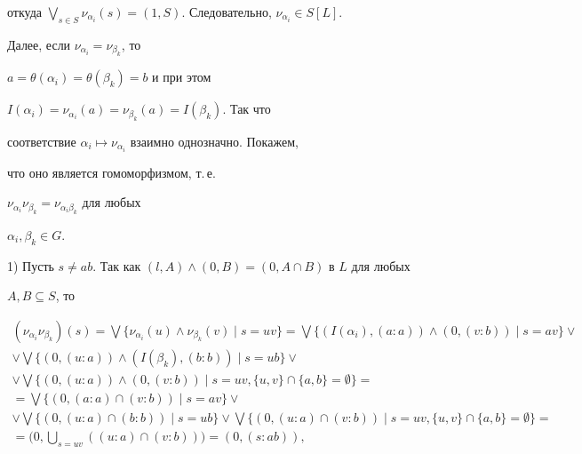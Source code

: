 откуда $\bigvee\limits_{s\in


S}\nu_{\alpha_i}(s)=(1,S)$. Следовательно, $\nu_{\alpha_i}\in S[L]$.





Далее, если $\nu_{\alpha_i}=\nu_{\beta_k}$, то


$a=\theta(\alpha_i)=\theta(\beta_k)=b$ и при этом


$I(\alpha_i)=\nu_{\alpha_i}(a)=\nu_{\beta_k}(a)=I(\beta_k)$. Так что


соответствие $\alpha_i\mapsto \nu_{\alpha_i}$ взаимно однозначно. Покажем,


что оно является гомоморфизмом, т.\,е.


$\nu_{\alpha_i}\nu_{\beta_k}=\nu_{\alpha_i\beta_k}$ для любых


$\alpha_i,\beta_k\in G$.





1) Пусть $s\ne ab$. Так как $(l,A)\wedge(0,B)=(0,A\cap B)$ в $L$ для любых


$A,B\subseteq S$, то


\begin{multline*}


(\nu_{\alpha_i}\nu_{\beta_k})(s)=\bigvee\{\nu_{\alpha_i}(u)\wedge


\nu_{\beta_k}(v)\mid


s=uv\}=\bigvee\{(I(\alpha_i),(a:a))\wedge(0,(v:b))\mid s=av\}\vee \\


%


\vee \bigvee\{(0,(u:a))\wedge (I(\beta_k),(b:b))\mid


s=ub\}\vee \\


%


\vee\bigvee\{(0,(u:a))\wedge (0,(v:b))\mid s=uv,


\{u,v\}\cap\{a,b\}=\emptyset\}= \\


%


=\bigvee\{(0,(a:a)\cap (v:b))\mid s=av\}\vee \\


%


\vee\bigvee\{(0,(u:a)\cap(b:b))\mid


s=ub\}\vee\bigvee\{(0,(u:a)\cap(v:b))\mid s=uv,


\{u,v\}\cap\{a,b\}=\emptyset\}= \\


%


=\Big(0,\bigcup_{s=uv}((u:a)\cap(v:b))\Big)=(0,(s:ab)),


\end{multline*}


